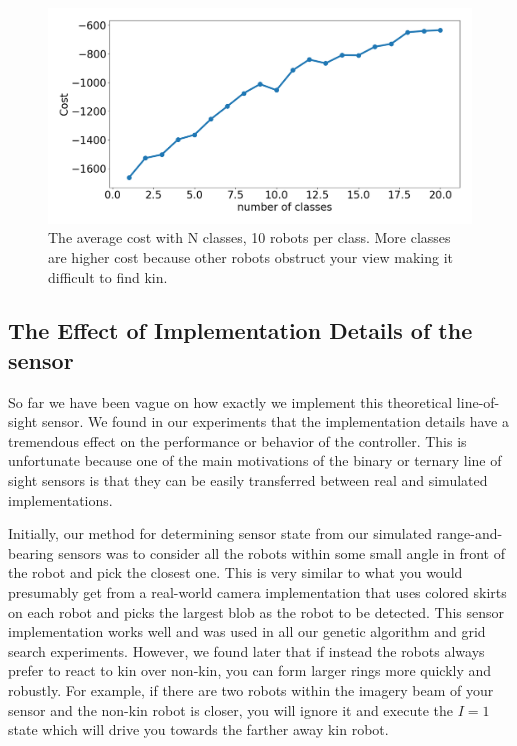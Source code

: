\documentclass[conference]{IEEEtran}
\begin{document}
    \begin{figure}[H]
      \centering
      \includegraphics[width=1\linewidth]{./images/num_classes_vs_cost_10_per_class.png}
      \caption{The average cost with N classes, 10 robots per class. More classes are higher cost because other robots obstruct your view making it difficult to find kin.}
      \label{fig:num_classes_10}
    \end{figure}

  \subsection{The Effect of Implementation Details of the sensor} \label{section:sensor_impl}

    So far we have been vague on how exactly we implement this theoretical line-of-sight sensor. We found in our experiments that the implementation details have a tremendous effect on the performance or behavior of the controller. This is unfortunate because one of the main motivations of the binary or ternary line of sight sensors is that they can be easily transferred between real and simulated implementations.

    Initially, our method for determining sensor state from our simulated range-and-bearing sensors was to consider all the robots within some small angle in front of the robot and pick the closest one. This is very similar to what you would presumably get from a real-world camera implementation that uses colored skirts on each robot and picks the largest blob as the robot to be detected. This sensor implementation works well and was used in all our genetic algorithm and grid search experiments. However, we found later that if instead the robots always prefer to react to kin over non-kin, you can form larger rings more quickly and robustly. For example, if there are two robots within the imagery beam of your sensor and the non-kin robot is closer, you will ignore it and execute the $I=1$ state which will drive you towards the farther away kin robot.
\end{document}

